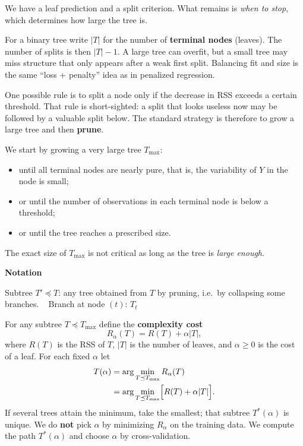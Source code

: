 \documentclass[
]{book}
\begin{document}
We have a leaf prediction and a split criterion. What remains is \emph{when to stop}, which determines how large the tree is. ~

For a binary tree write \(|T|\) for the number of \textbf{terminal nodes} (leaves). The number of splits is then \(|T|-1\). A large tree can overfit, but a small tree may miss structure that only appears after a weak first split. Balancing fit and size is the same ``loss + penalty'' idea as in penalized regression.

One possible rule is to split a node only if the decrease in RSS exceeds a certain threshold. That rule is short-sighted: a split that looks useless now may be followed by a valuable split below. The standard strategy is therefore to grow a large tree and then \textbf{prune}.

We start by growing a very large tree \(T_{\max}\):

\begin{itemize}
\item
  until all terminal nodes are nearly pure, that is, the variability of \(Y\) in the node is small;
\item
  or until the number of observations in each terminal node is below a threshold;
\item
  or until the tree reaches a prescribed size.
\end{itemize}

The exact size of \(T_{\max}\) is not critical as long as the tree is \emph{large enough}.

\textbf{Notation}

Subtree \(T' \preceq T\): any tree obtained from \(T\) by pruning, i.e.~by collapsing some branches.
~
Branch at node \((t)\): \(T_t\)

For any subtree \(T \preceq T_{\max}\) define the \textbf{complexity cost}
\[R_{\alpha}(T) = R(T) + \alpha|T|,\]
where \(R(T)\) is the RSS of \(T\), \(|T|\) is the number of leaves, and \(\alpha \ge 0\) is the cost of a leaf. For each fixed \(\alpha\) let
\begin{align*}
T(\alpha) &= \arg\min_{T\preceq T_{\max}} R_{\alpha}(T) \\
&= \arg\min_{T\preceq T_{\max}} \Bigl[ R(T) + \alpha|T|\Bigr].
\end{align*}
If several trees attain the minimum, take the smallest; that subtree \(T^{*}(\alpha)\) is unique. We do \textbf{not} pick \(\alpha\) by minimizing \(R_{\alpha}\) on the training data. We compute the path \(T^{*}(\alpha)\) and choose \(\alpha\) by cross-validation.
~~
\end{document}
